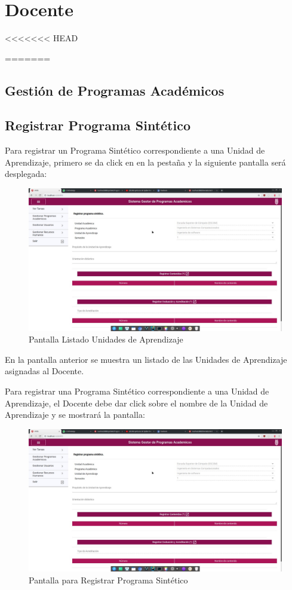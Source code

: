 \chapter{Docente}
<<<<<<< HEAD






=======
\section{Gestión de Programas Académicos}
\section{Registrar Programa Sintético}
Para registrar un Programa Sintético correspondiente a una Unidad de Aprendizaje, primero se da click en en la pestaña  y la siguiente pantalla será desplegada:

\begin{figure}[H]
    \centering
    \hypertarget{2}{\includegraphics[width=0.5\linewidth]{images/SP6/1.jpeg}}
    \caption{Pantalla Listado Unidades de Aprendizaje}
\end{figure}

En la pantalla anterior se muestra un listado de las Unidades de Aprendizaje asignadas al Docente.

Para registrar una Programa Sintético correspondiente a una Unidad de Aprendizaje, el Docente debe dar click sobre el nombre de la Unidad de Aprendizaje y se mostrará la pantalla:

\pagebreak
\begin{figure}[H]
    \centering
    \includegraphics[width=0.5\linewidth]{images/SP6/1.jpeg}
    \caption{Pantalla para Registrar Programa Sintético}
\end{figure}

